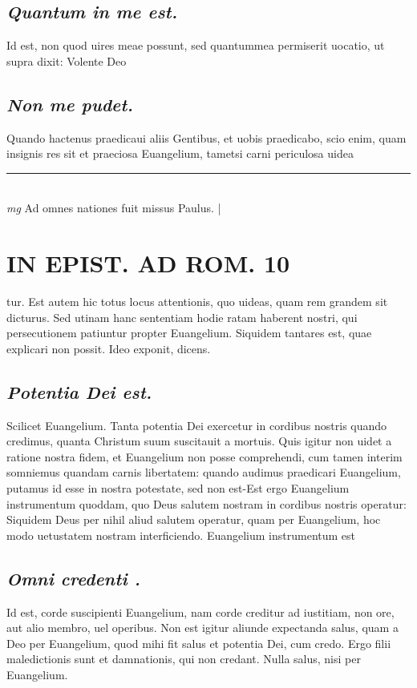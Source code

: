 \documentclass{article}
\begin{document}
\begin{pages}
\subsection*{\textit{Quantum in me est. }}\pstart Id est, non quod uires meae possunt, sed quantummea permiserit uocatio, ut supra dixit: Volente Deo  \pend
{}
{}
\subsection*{\textit{Non me pudet. }}\pstart Quando hactenus praedicaui aliis Gentibus, et uobis praedicabo, scio enim, quam insignis res sit et praeciosa Euangelium, tametsi carni periculosa uidea\pend
\vspace{0.5cm}\noindent
\vspace{0.2cm}\rule{1cm}{0.2pt}\\ 
\hspace{0.2cm}\textit{mg}
\footnotesize Ad omnes nationes fuit missus Paulus. 
\normalsize| 
\section*{IN EPIST. AD ROM.  10 }
\marginpar{[ p.]}\pstart tur. Est autem hic totus locus attentionis, quo uideas, quam rem grandem sit dicturus. Sed utinam hanc sententiam hodie ratam haberent nostri, qui persecutionem patiuntur propter Euangelium. Siquidem tantares est, quae explicari non possit. Ideo exponit, dicens.   \pend
{}
{}
\subsection*{\textit{Potentia Dei est. }}\pstart Scilicet Euangelium. Tanta potentia Dei exercetur in cordibus nostris quando credimus, quanta Christum suum suscitauit a mortuis. Quis igitur non uidet a ratione nostra fidem, et Euangelium non posse comprehendi, cum tamen interim somniemus quandam carnis libertatem: quando audimus praedicari Euangelium, putamus id esse in nostra potestate, sed non est-Est ergo Euangelium instrumentum quoddam, quo Deus salutem nostram in cordibus nostris operatur: Siquidem Deus per nihil aliud salutem operatur, quam per Euangelium, hoc modo uetustatem nostram interficiendo.  Euangelium instrumentum est  \pend
{}
{}
\subsection*{\textit{Omni credenti . }}\pstart Id est, corde suscipienti Euangelium, nam corde creditur ad iustitiam, non ore, aut alio membro, uel operibus. Non est igitur aliunde expectanda salus, quam a Deo per Euangelium, quod mihi fit salus et potentia Dei, cum credo. Ergo filii maledictionis sunt et damnationis, qui non credant.  Nulla salus, nisi per Euangelium.   \pend
{}
{}

\end{pages}
\end{document}

